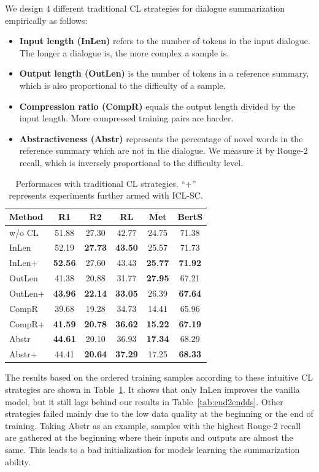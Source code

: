 We design $4$ different traditional CL strategies %
for dialogue summarization empirically as follows:
\begin{itemize}
	\item \textbf{Input length (InLen)} refers to the number of tokens in the input dialogue. The longer a dialogue is, the more complex a sample is.
	\item \textbf{Output length (OutLen)} is the number of tokens in a reference summary, which is also proportional to the difficulty of a sample.
	\item \textbf{Compression ratio (CompR)} equals the output length divided by the input length. More compressed training pairs are harder.%
	\item \textbf{Abstractiveness (Abstr)} represents the percentage of novel words in the reference summary which are not in the dialogue. We measure it by Rouge-2 recall, which is inversely proportional to the difficulty level.
\end{itemize}

\begin{table}[th!]
	\scriptsize
	\centering
	\begin{tabular}{lccccc}
		\hline
		{Method} & {R1} & {R2} & {RL} & {Met} & {BertS} \\
		\hline
		w/o CL & 51.88 & 27.30 & 42.77 & 24.75 & 71.38 \\
		\hline
		InLen & 52.19 & \textbf{27.73} & \textbf{43.50} & 25.57 & 71.73\\
		InLen+ & \textbf{52.56} & 27.60 & 43.43 & \textbf{25.77} & \textbf{71.92}\\
		\hline
		OutLen & 41.38 & 20.88 & 31.77 & \textbf{27.95} & 67.21\\
		OutLen+ &\textbf{43.96} & \textbf{22.14} & \textbf{33.05} & 26.39 & \textbf{67.64} \\
		\hline
		CompR & 39.68 & 19.28 & 34.73 & 14.41 & 65.96 \\
		CompR+ & \textbf{41.59} & \textbf{20.78} & \textbf{36.62} & \textbf{15.22} & \textbf{67.19}\\
		\hline
		Abstr & \textbf{44.61} & 20.10 & 36.93 & \textbf{17.34} & 68.29 \\
		Abstr+ & 44.41 & \textbf{20.64} & \textbf{37.29} & 17.25 & \textbf{68.33} \\
		\hline
	\end{tabular}
	\caption{Performaces with traditional CL strategies. ``+'' represents experiments further armed with ICL-SC.}
	\label{tab:traditional}
\end{table}
The results based on the ordered training samples according to these intuitive CL strategies are shown in Table~\ref{tab:traditional}. It shows that only InLen improves the vanilla model, but it still lags behind our results in Table~\ref{tab:end2endds}. Other strategies failed mainly due to the low data quality at the beginning or the end of training. 
Taking Abstr as an example, samples with the highest 
Rouge-2 recall are gathered at the beginning where 
their inputs and outputs are almost the same. 
This leads to a bad initialization for models learning 
the summarization ability. 

